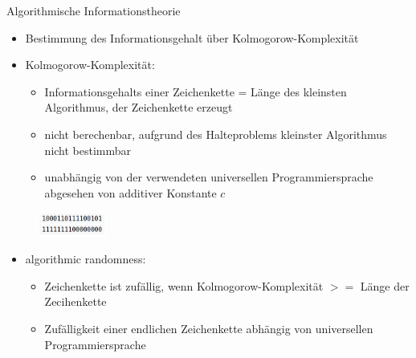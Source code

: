 \documentclass[aspectratio=1610, 9pt]{beamer}
\begin{document}
\begin{frame}{Algorithmische Informationstheorie}
  \begin{itemize}
    \item Bestimmung des Informationsgehalt über Kolmogorow-Komplexität
    \item Kolmogorow-Komplexität:
    \begin{itemize}
      \item Informationsgehalts einer Zeichenkette = Länge des kleinsten Algorithmus, der Zeichenkette erzeugt
      \item nicht berechenbar, aufgrund des Halteproblems kleinster Algorithmus nicht bestimmbar
      \item unabhängig von der verwendeten universellen Programmiersprache abgesehen von additiver Konstante $c$
    \end{itemize}
  \end{itemize}
  \begin{figure}
    \includegraphics[width=0.2\textwidth]{images/kolmo.png}
  \end{figure}
  \begin{itemize}
    \item algorithmic randomness:
    \begin{itemize}
      \item Zeichenkette ist zufällig, wenn Kolmogorow-Komplexität $>=$ Länge der Zecihenkette
      \item Zufälligkeit einer endlichen Zeichenkette abhängig von universellen Programmiersprache
    \end{itemize}
  \end{itemize}
\end{frame}
\end{document}
